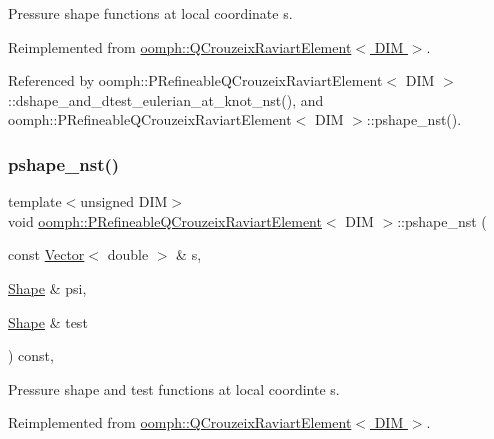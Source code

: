 Pressure shape functions at local coordinate s. 



Reimplemented from \hyperlink{classoomph_1_1QCrouzeixRaviartElement_a122c4b7ae47df08a07acd2f1ed6f61b0}{oomph\+::\+Q\+Crouzeix\+Raviart\+Element$<$ D\+I\+M $>$}.



Referenced by oomph\+::\+P\+Refineable\+Q\+Crouzeix\+Raviart\+Element$<$ D\+I\+M $>$\+::dshape\+\_\+and\+\_\+dtest\+\_\+eulerian\+\_\+at\+\_\+knot\+\_\+nst(), and oomph\+::\+P\+Refineable\+Q\+Crouzeix\+Raviart\+Element$<$ D\+I\+M $>$\+::pshape\+\_\+nst().

\mbox{\label{classoomph_1_1PRefineableQCrouzeixRaviartElement_a5891e3675a411f77fca204fa567c71da}} 
\subsubsection{\texorpdfstring{pshape\+\_\+nst()}{pshape\_nst()}\hspace{0.1cm}{\footnotesize\ttfamily [2/6]}}
{\footnotesize\ttfamily template$<$unsigned D\+IM$>$ \\
void \hyperlink{classoomph_1_1PRefineableQCrouzeixRaviartElement}{oomph\+::\+P\+Refineable\+Q\+Crouzeix\+Raviart\+Element}$<$ D\+IM $>$\+::pshape\+\_\+nst (\begin{DoxyParamCaption}\item[{const \hyperlink{classoomph_1_1Vector}{Vector}$<$ double $>$ \&}]{s,  }\item[{\hyperlink{classoomph_1_1Shape}{Shape} \&}]{psi,  }\item[{\hyperlink{classoomph_1_1Shape}{Shape} \&}]{test }\end{DoxyParamCaption}) const\hspace{0.3cm}{\ttfamily [inline]}, {\ttfamily [virtual]}}



Pressure shape and test functions at local coordinte s. 



Reimplemented from \hyperlink{classoomph_1_1QCrouzeixRaviartElement_a662b9593c9ca0b4589d5498812f1fb91}{oomph\+::\+Q\+Crouzeix\+Raviart\+Element$<$ D\+I\+M $>$}.

